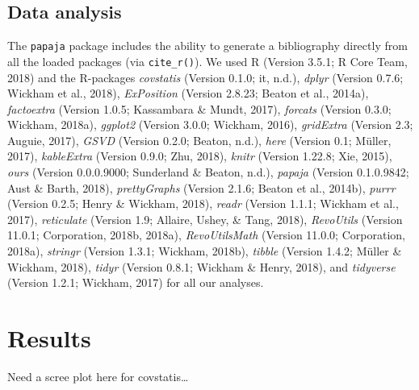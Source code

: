 \documentclass[man,floatsintext]{apa6}
\theoremstyle{definition}
\theoremstyle{definition}
\theoremstyle{definition}
\theoremstyle{remark}
\begin{document}
\hypertarget{data-analysis}{%
\subsection{Data analysis}\label{data-analysis}}

The \texttt{papaja} package includes the ability to generate a
bibliography directly from all the loaded packages (via
\texttt{cite\_r()}). We used R (Version 3.5.1; R Core Team, 2018) and
the R-packages \emph{covstatis} (Version 0.1.0; it, n.d.), \emph{dplyr}
(Version 0.7.6; Wickham et al., 2018), \emph{ExPosition} (Version
2.8.23; Beaton et al., 2014a), \emph{factoextra} (Version 1.0.5;
Kassambara \& Mundt, 2017), \emph{forcats} (Version 0.3.0; Wickham,
2018a), \emph{ggplot2} (Version 3.0.0; Wickham, 2016), \emph{gridExtra}
(Version 2.3; Auguie, 2017), \emph{GSVD} (Version 0.2.0; Beaton, n.d.),
\emph{here} (Version 0.1; Müller, 2017), \emph{kableExtra} (Version
0.9.0; Zhu, 2018), \emph{knitr} (Version 1.22.8; Xie, 2015), \emph{ours}
(Version 0.0.0.9000; Sunderland \& Beaton, n.d.), \emph{papaja} (Version
0.1.0.9842; Aust \& Barth, 2018), \emph{prettyGraphs} (Version 2.1.6;
Beaton et al., 2014b), \emph{purrr} (Version 0.2.5; Henry \& Wickham,
2018), \emph{readr} (Version 1.1.1; Wickham et al., 2017),
\emph{reticulate} (Version 1.9; Allaire, Ushey, \& Tang, 2018),
\emph{RevoUtils} (Version 11.0.1; Corporation, 2018b, 2018a),
\emph{RevoUtilsMath} (Version 11.0.0; Corporation, 2018a),
\emph{stringr} (Version 1.3.1; Wickham, 2018b), \emph{tibble} (Version
1.4.2; Müller \& Wickham, 2018), \emph{tidyr} (Version 0.8.1; Wickham \&
Henry, 2018), and \emph{tidyverse} (Version 1.2.1; Wickham, 2017) for
all our analyses.

\hypertarget{results}{%
\section{Results}\label{results}}

Need a scree plot here for covstatis\ldots{}
\end{document}
